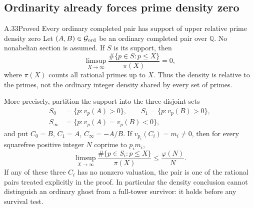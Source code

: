 \subsection{Ordinarity already forces prime density zero}

\begin{result}{A.33}{Proved}
{Every ordinary completed pair has support of upper relative prime density zero}
Let \((A,B)\in\mathcal G_{\rm ord}\) be an ordinary completed pair over
\(\mathbb Q\).  No nonabelian section is assumed.  If \(S\) is its
support, then
\[
 \limsup_{X\longrightarrow\infty}
       \frac{\#\{p\in S:p\le X\}}{\pi(X)}=0,
\tag{A.33.1}
\]
where \(\pi(X)\) counts all rational primes up to \(X\).
Thus the density is relative to the primes, not the ordinary integer
density shared by every set of primes.

More precisely, partition the support into the three disjoint sets
\[
 \begin{split}
 S_0&=\{p:v_p(A)>0\},\qquad S_1=\{p:v_p(B)>0\},\\
 S_\infty&=\{p:v_p(A)=v_p(B)<0\},
 \end{split}
\tag{A.33.2}
\]
and put \(C_0=B\), \(C_1=A\), \(C_\infty=-A/B\).
If \(v_{p_i}(C_i)=m_i\ne0\), then for every squarefree positive
integer \(N\) coprime to \(p_i m_i\),
\[
 \limsup_{X\longrightarrow\infty}
       \frac{\#\{p\in S_i:p\le X\}}{\pi(X)}
           \le \frac{\varphi(N)}{N}.
\tag{A.33.3}
\]
If any of these three \(C_i\) has no nonzero valuation, the pair is
one of the rational pairs treated explicitly in the proof.
In particular the density conclusion cannot distinguish an ordinary
ghost from a full-tower survivor: it holds before any survival test.
\end{result}

